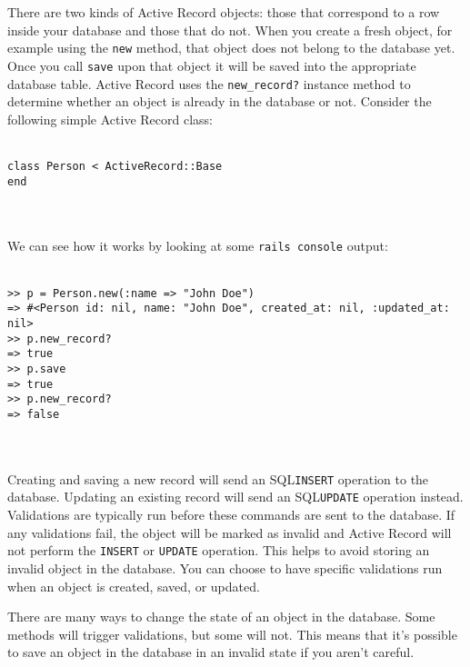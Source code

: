 \documentclass[10pt]{book}
\begin{document}
There are two kinds of Active Record objects: those that correspond  to a row inside your database and those that do not. When you create a  fresh object, for example using the \texttt{new} method, that object does not belong to the database yet. Once you call \texttt{save} upon that object it will be saved into the appropriate database table. Active Record uses the \texttt{new\_record?}  instance method to determine whether an object is already in the  database or not. Consider the following simple Active Record class:
\\ \\
\begin{minipage}{\textwidth}{\scriptsize
\begin{verbatim}
class Person < ActiveRecord::Base
end
\end{verbatim}}
\end{minipage}
\\ \\


We can see how it works by looking at some \texttt{rails console} output:
\\ \\
\begin{minipage}{\textwidth}{\scriptsize
\begin{verbatim}
>> p = Person.new(:name => "John Doe")
=> #<Person id: nil, name: "John Doe", created_at: nil, :updated_at: nil>
>> p.new_record?
=> true
>> p.save
=> true
>> p.new_record?
=> false
\end{verbatim}}
\end{minipage}
\\ \\

Creating and saving a new record will send an SQL\texttt{INSERT} operation to the database. Updating an existing record will send an SQL\texttt{UPDATE}  operation instead. Validations are typically run before these commands  are sent to the database. If any validations fail, the object will be  marked as invalid and Active Record will not perform the \texttt{INSERT} or \texttt{UPDATE}  operation. This helps to avoid storing an invalid object in the  database. You can choose to have specific validations run when an object  is created, saved, or updated.

There are many ways to change the state of an  object in the database. Some methods will trigger validations, but some  will not. This means that it’s possible to save an object in the  database in an invalid state if you aren’t careful.
\end{document}
